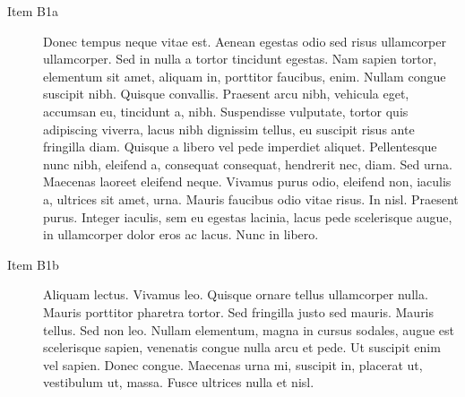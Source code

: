 \documentclass[twoside]{extreport}
\begin{document}
\begin{description}
\begin{description}
\begin{description}
\item[Item B1a]
Donec tempus neque vitae est. Aenean egestas odio sed risus ullamcorper
ullamcorper. Sed in nulla a tortor tincidunt egestas. Nam sapien tortor,
elementum sit amet, aliquam in, porttitor faucibus, enim. Nullam congue
suscipit nibh. Quisque convallis. Praesent arcu nibh, vehicula eget,
accumsan eu, tincidunt a, nibh. Suspendisse vulputate, tortor quis
adipiscing viverra, lacus nibh dignissim tellus, eu suscipit risus ante
fringilla diam. Quisque a libero vel pede imperdiet aliquet.
Pellentesque nunc nibh, eleifend a, consequat consequat, hendrerit nec,
diam. Sed urna. Maecenas laoreet eleifend neque. Vivamus purus odio,
eleifend non, iaculis a, ultrices sit amet, urna. Mauris faucibus odio
vitae risus. In nisl. Praesent purus. Integer iaculis, sem eu egestas
lacinia, lacus pede scelerisque augue, in ullamcorper dolor eros ac
lacus. Nunc in libero.
\item[Item B1b]
Aliquam lectus. Vivamus leo. Quisque ornare tellus ullamcorper nulla.
Mauris porttitor pharetra tortor. Sed fringilla justo sed mauris. Mauris
tellus. Sed non leo. Nullam elementum, magna in cursus sodales, augue
est scelerisque sapien, venenatis congue nulla arcu et pede. Ut suscipit
enim vel sapien. Donec congue. Maecenas urna mi, suscipit in, placerat
ut, vestibulum ut, massa. Fusce ultrices nulla et nisl.


\end{description}
\end{description}
\end{description}
\end{document}
